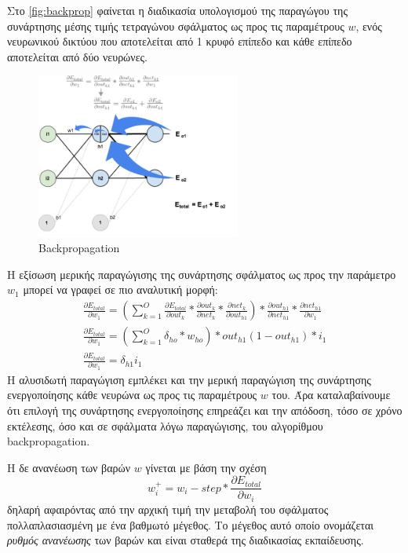 Στο \autoref{fig:backprop} φαίνεται η διαδικασία υπολογισμού της παραγώγου της συνάρτησης
μέσης τιμής τετραγώνου σφάλματος ως προς τις παραμέτρους $w$,
ενός νευρωνικού δικτύου που αποτελείται από 1 κρυφό επίπεδο και κάθε επίπεδο
αποτελείται από δύο νευρώνες.

\begin{figure}[!ht]
  \centering
  \hspace*{2cm} 
  \includegraphics[width=0.6\textwidth]{./images/chapter3/backprop.png}
  \caption[Backpropagation]{Backpropagation}
  \label{fig:backprop}
\end{figure}

Η εξίσωση μερικής παραγώγισης της συνάρτησης σφάλματος ως προς την παράμετρο
$w_{1}$ μπορεί να γραφεί σε πιο αναλυτική μορφή:
\begin{gather*}
  \frac{\partial E_{total}}{\partial w_{1}} = (\sum_{k=1}^{O}\frac{\partial E_{total}}{\partial out_{k}}*\frac{\partial out_{k}}{\partial net_{k}}*\frac{\partial net_{k}}{\partial out_{h1}})*\frac{\partial out_{h1}}{\partial net_{h1}}*\frac{\partial net_{h1}}{\partial w_{1}} \\
  \frac{\partial E_{total}}{\partial w_{1}} = (\sum_{k=1}^{O}\delta_{ho}*w_{ho}) * out_{h1}(1-out_{h1}) * i_{1} \\
  \frac{\partial E_{total}}{\partial w_{1}} = \delta_{h1}i_{1}
\end{gather*}
Η αλυσιδωτή παραγώγιση εμπλέκει και την μερική παραγώγιση της
συνάρτησης ενεργοποίησης κάθε νευρώνα ως προς τις παραμέτρους $w$ του.
Άρα καταλαβαίνουμε ότι επιλογή της
συνάρτησης ενεργοποίησης επηρεάζει και την απόδοση, τόσο σε χρόνο εκτέλεσης,
όσο και σε σφάλματα λόγω παραγώγισης, του αλγορίθμου backpropagation.

Η δε ανανέωση των βαρών $w$ γίνεται με βάση την σχέση
\begin{equation*}
  w_{i}^{+} = w_{i} - step * \frac{\partial E_{total}}{\partial w_{i}}
\end{equation*}
δηλαρή αφαιρόντας από την αρχική τιμή την μεταβολή του σφάλματος πολλαπλασιασμένη
με ένα βαθμωτό μέγεθος. Το μέγεθος αυτό οποίο ονομάζεται \emph{ρυθμός ανανέωσης}
των βαρών και είναι σταθερά της διαδικασίας εκπαίδευσης.

